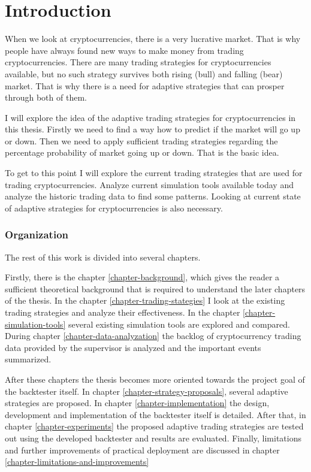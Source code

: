 
\chapter{Introduction}

When we look at cryptocurrencies, there is a very lucrative market. That is why people have always found new ways to make money from trading cryptocurrencies. There are many trading strategies for cryptocurrencies available, but no such strategy survives both rising (bull) and falling (bear) market. That is why there is a need for adaptive strategies that can prosper through both of them.

I will explore the idea of the adaptive trading strategies for cryptocurrencies in this thesis. Firstly we need to find a way how to predict if the market will go up or down. Then we need to apply sufficient trading strategies regarding the percentage probability of market going up or down. That is the basic idea.

To get to this point I will explore the current trading strategies that are used for trading cryptocurrencies. Analyze current simulation tools available today and analyze the historic trading data to find some patterns. Looking at current state of adaptive strategies for cryptocurrencies is also necessary.

\subsection*{Organization}

The rest of this work is divided into several chapters.

Firstly, there is the chapter \ref{chapter-background}, which gives the reader a sufficient theoretical background that is required to understand the later chapters of the thesis. In the chapter \ref{chapter-trading-stategies} I look at the existing trading strategies and analyze their effectiveness. In the chapter \ref{chapter-simulation-tools} several existing simulation tools are explored and compared. During chapter \ref{chapter-data-analyzation} the backlog of cryptocurrency trading data provided by the supervisor is analyzed and the important events summarized.

After these chapters the thesis becomes more oriented towards the project goal of the backtester itself. In chapter \ref{chapter-strategy-proposals}, several adaptive strategies are proposed. In chapter \ref{chapter-implementation} the design, development and implementation of the backtester itself is detailed. After that, in chapter \ref{chapter-experiments} the proposed adaptive trading strategies are tested out using the developed backtester and results are evaluated. Finally, limitations and further improvements of practical deployment are discussed in chapter \ref{chapter-limitations-and-improvements}


